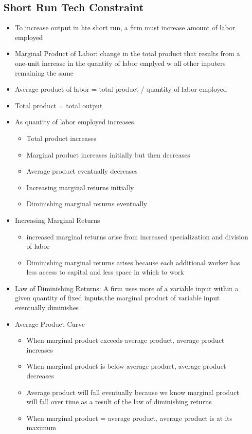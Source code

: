 \documentclass[11pt]{article}
\begin{document}
\subsection{Short Run Tech Constraint}
\label{sec:org3d815af}
\begin{itemize}
\item To increase output in hte short run, a firm must increase amount of labor employed
\item Marginal Product of Labor: change in the total product that results from a one-unit increase in the quantity of labor emplyed w all other inputers remaining the same
\item Average product of labor = total product / quantity of labor employed
\item Total product = total output
\item As quantity of labor employed increases,
\begin{itemize}
\item Total product increases
\item Marginal product increases initially but then decreases
\item Average product eventually decreases
\item Increasing marginal returns initially
\item Diminishing marginal returns eventually
\end{itemize}
\item Increasing Marginal Returns
\begin{itemize}
\item increased marginal returns arise from increased specialization and division of labor
\item Diminishing marginal returns arises because each additional worker has less access to capital and less space in which to work
\end{itemize}
\item Law of Diminishing Returns: A firm uses more of a variable input within a given quantity of fixed inputs,the marginal product of variable input eventually diminishes
\item Average Product Curve
\begin{itemize}
\item When marginal product exceeds average product, average product increases
\item When marginal product is below average product, average product decreases
\item Average product will fall eventually because we know marginal product will fall over time as a result of the law of diminishing returns
\item When marginal product = average product, average product is at its maximum
\end{itemize}
\end{itemize}
\end{document}
